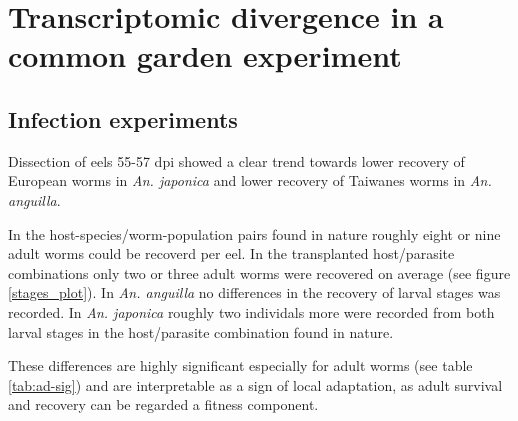 
\chapter{Transcriptomic divergence in a common garden experiment}
\label{cha:tra-diff}


\ifpdf
    \graphicspath{{6_rna_seq/figures/PNG/}{6_rna_seq/figures/PDF/}{6_rna_seq/figures/}}
\else
    \graphicspath{{6_rna_seq/figures/EPS/}{6_rna_seq/figures/}}
\fi




\section{Infection experiments}

Dissection of eels 55-57 dpi showed a clear trend towards lower
recovery of European worms in \textit{An. japonica} and lower recovery
of Taiwanes worms in \textit{An. anguilla}.


In the host-species/worm-population pairs found in nature roughly
eight or nine adult worms could be recoverd per eel. In the
transplanted host/parasite combinations only two or three adult worms
were recovered on average (see figure \ref{stages_plot}). In
\textit{An. anguilla} no differences in the recovery of larval stages
was recorded. In \textit{An. japonica} roughly two individals more
were recorded from both larval stages in the host/parasite combination
found in nature.

These differences are highly significant especially for adult worms
(see table \ref{tab:ad-sig}) and are interpretable as a sign of local
adaptation, as adult survival and recovery can be regarded a fitness
component.

